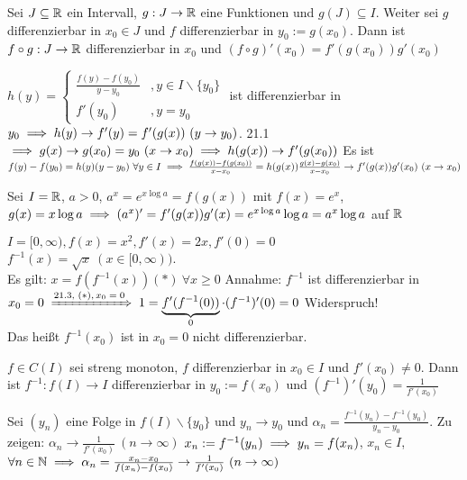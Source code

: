 \documentclass[a4paper,oneside,DIV15,BCOR12mm]{scrbook}
\begin{document}
\begin{satz}[Kettenregel]
Sei $J\subseteq\mathbb{R}$ ein Intervall, $g:J\to \mathbb{R}$ eine Funktionen und $g(J)\subseteq I$. Weiter sei $g$ differenzierbar in $x_0 \in J$ und $f$ differenzierbar in $y_0 := g(x_0)$.
Dann ist $f\circ g: J\to \mathbb{R}$ differenzierbar in $x_0$ und $(f\circ g)' (x_0) = f'(g(x_0))g'(x_0)$
\end{satz}

\begin{beweis}
$h(y) = \begin{cases}\frac{f(y)-f(y_0)}{y-y_0} &, y \in I\backslash\{y_0\} \\ f'(y_0) &, y=y_0\end{cases}$ ist differenzierbar in $y_0 \implies h(y) \to f'(y) = f'(g(x)) \ (y\to y_0)$. 21.1 $\implies g(x) \to g(x_0) = y_0 \ (x\to x_0) \implies h(g(x)) \to f'(g(x_0))$ Es ist $f(y) - f(y_0) = h(y)(y-y_0) \ \forall y\in I \implies \frac{f(g(x)) - f(g(x_0))}{x-x_0} = h(g(x))\frac{g(x)-g(x_0)}{x-x_0} \to f'(g(x))g'(x_0)\ (x\to x_0)$
\end{beweis}

\begin{beispiele}
\item Sei $I=\mathbb{R}$, $a>0$, $a^x = e^{x\log a} = f(g(x))$ mit $f(x)= e^x$, $g(x)= x\log a \implies (a^x)' = f'(g(x))g'(x) = e^{x\log a} \log a = a^x \log a $ auf $\mathbb{R}$
\item $I= [0,\infty), f(x)=x^2, f'(x)=2x, f'(0)=0$\\
 $f^{-1}(x) = \sqrt{x} \ (x\in [0,\infty))$. \\
 Es gilt: $x= f(f^{-1}(x)) (*) \ \forall x\ge 0$ Annahme: $f^{-1}$ ist differenzierbar in $x_0 = 0 \folgtnach{21.3, \ensuremath{(*), x_0 =0}} 1 = \underbrace{f'(f^{-1}(0))}_{0}\cdot(f^{-1})'(0) = 0$ Widerspruch!\\ Das heißt $f^{-1}(x_0)$ ist in $x_0 = 0$ nicht differenzierbar.
\end{beispiele}

\begin{satz}
$f\in C(I)$ sei streng monoton, $f$ differenzierbar in $x_0\in I$ und $f'(x_0)\ne 0$. Dann ist $f^{-1}: f(I) \to I$ differenzierbar in $y_0 := f(x_0)$ und $(f^{-1})'(y_0) = \frac{1}{f'(x_0)}$
\end{satz}

\begin{beweis}
Sei $(y_n)$ eine Folge in $f(I)\backslash\{y_0\}$ und $y_n \to y_0$ und $\alpha_n= \frac{f^{-1}(y_n) - f^{-1}(y_0)}{y_n-y_0}$. Zu zeigen: $\alpha_n \to \frac{1}{f'(x_0)} \ (n\to\infty)$
$x_n := f^{-1}(y_n) \implies y_n = f(x_n)$, $x_n \in I$, $\forall n\in\MdN \folgt \alpha_n = \frac{x_n-x_0}{f(x_n)-f(x_0)} \to \frac{1}{f'(x_0)} \ (n\to\infty)$
\end{beweis}
\end{document}
